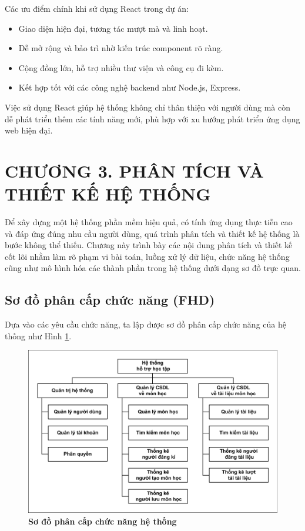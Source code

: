 \documentclass{article}
\begin{document}
	Các ưu điểm chính khi sử dụng React trong dự án:
	\begin{itemize}
		\item Giao diện hiện đại, tương tác mượt mà và linh hoạt.
		\item Dễ mở rộng và bảo trì nhờ kiến trúc component rõ ràng.
		\item Cộng đồng lớn, hỗ trợ nhiều thư viện và công cụ đi kèm.
		\item Kết hợp tốt với các công nghệ backend như Node.js, Express.
	\end{itemize}
	
	Việc sử dụng React giúp hệ thống không chỉ thân thiện với người dùng mà còn dễ phát triển thêm các tính năng mới, phù hợp với xu hướng phát triển ứng dụng web hiện đại.
	\newpage
	\section*{CHƯƠNG 3. PHÂN TÍCH VÀ THIẾT KẾ HỆ THỐNG}
	\setcounter{section}{3}
	\setcounter{subsection}{0}
	\setcounter{figure}{0}
	\setcounter{table}{0}
	
	Để xây dựng một hệ thống phần mềm hiệu quả, có tính ứng dụng thực tiễn cao và đáp ứng đúng nhu cầu người dùng, quá trình phân tích và thiết kế hệ thống là bước không thể thiếu. Chương này trình bày các nội dung phân tích và thiết kế cốt lõi nhằm làm rõ phạm vi bài toán, luồng xử lý dữ liệu, chức năng hệ thống cũng như mô hình hóa các thành phần trong hệ thống dưới dạng sơ đồ trực quan.
	
	\subsection{Sơ đồ phân cấp chức năng (FHD)}
	
	Dựa vào các yêu cầu chức năng, ta lập được sơ đồ phân cấp chức năng của hệ thống như Hình \ref{fig31}.
	
	\begin{figure}[!ht]
		\centering
		\includegraphics[trim= 10pt 10pt 10pt 10pt, clip, width=16cm]{fhd_fig31_2.pdf}
		\caption [Sơ đồ phân cấp chức năng hệ thống]{\bfseries \fontsize{12pt}{0pt}\selectfont Sơ đồ phân cấp chức năng hệ thống}
		\label{fig31}
	\end{figure}
	
\end{document}
